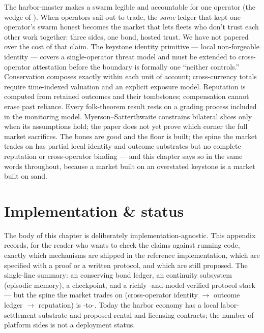 \documentclass[11pt,a4paper]{article}
\theoremstyle{definition}
\theoremstyle{definition}
\theoremstyle{remark}
\begin{document}
The harbor-master makes a swarm legible and accountable for one operator (the
wedge of ). When operators sail out to trade, the \emph{same} ledger that
kept one operator's swarm honest becomes the market that lets fleets who don't trust
each other work together: three sides, one bond, hosted trust. We have not papered
over the cost of that claim. The keystone identity primitive --- local
non-forgeable identity --- covers a single-operator threat model and must be
extended to cross-operator attestation before the boundary is formally one
``neither controls.'' Conservation composes exactly within each unit of account;
cross-currency totals require time-indexed valuation and an explicit exposure model. Reputation is
computed from retained outcomes and their tombstones; compensation cannot erase past reliance. Every
folk-theorem result rests on a grading process included in the monitoring model.
Myerson--Satterthwaite constrains bilateral slices only when its assumptions hold;
the paper does not yet prove which corner the full market sacrifices. The bones are good and the floor is built; the spine the
market trades on has partial local identity and outcome substrates but no complete
reputation or cross-operator binding --- and this chapter says so in the same
words throughout, because a market built on an overstated keystone is a market built
on sand.

\appendix

\section{Implementation \& status}\label{app:impl}\label{app:fh-mech}

The body of this chapter is deliberately implementation-agnostic. This appendix
records, for the reader who wants to check the claims against running code, exactly
which mechanisms are shipped in the reference implementation, which are specified
with a proof or a written protocol, and which are still proposed. The single-line
summary: an \Built{} conserving bond ledger, an \Built{} continuity subsystem (episodic
memory), a \BuiltWeak{} checkpoint, and a richly \Designed{}-and-model-verified
protocol stack --- but the spine the market trades on (cross-operator identity
$\to$ outcome ledger $\to$ reputation) is \BuiltWeak{}-to-\Vision{}. Today the harbor
economy has a local labor-settlement substrate and proposed rental and
licensing contracts; the number of platform sides is not a deployment status.
\end{document}
